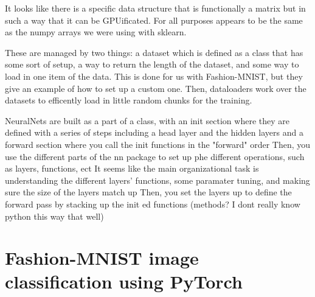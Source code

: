 It looks like there is a specific data structure that is functionally a matrix but in such a way that it can be GPUificated.
For all purposes appears to be the same as the numpy arrays we were using with sklearn.

These are managed by two things: a dataset which is defined as a class that has some sort of setup, a way to return the length of the dataset, and some way to load in one item of the data.
This is done for us with Fashion-MNIST, but they give an example of how to set up a custom one.
Then, dataloaders work over the datasets to efficently load in little random chunks for the training.

NeuralNets are built as a part of a class, with an init section where they are defined with a series of steps including a head layer and the hidden layers and a forward section where you call the init functions in the "forward" order
Then, you use the different parts of the nn package to set up phe different operations, such as layers, functions, ect
It seems like the main organizational task is understanding the different layers' functions, some paramater tuning, and making sure the size of the layers match up
Then, you set the layers up to define the forward pass by stacking up the init ed functions (methods? I dont really know python this way that well)






\section{Fashion-MNIST image classification  using PyTorch}





